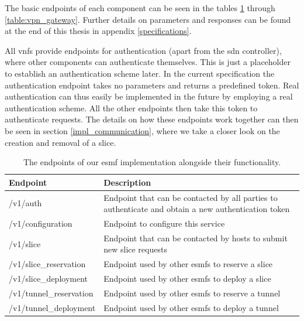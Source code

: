 The basic endpoints of each component can be seen in the tables \ref{table:esmf} through \ref{table:vpn_gateway}. Further details on parameters and responses can be found at the end of this thesis in appendix \ref{specifications}.

All \acrshort{vnf}s provide endpoints for authentication (apart from the \acrshort{sdn} controller), where other components can authenticate themselves. This is just a placeholder to establish an authentication scheme later. In the current specification the authentication endpoint takes no parameters and returns a predefined token. Real authentication can thus easily be implemented in the future by employing a real authentication scheme. All the other endpoints then take this token to authenticate requests. The details on how these endpoints work together can then be seen in section \ref{impl_communication}, where we take a closer look on the creation and removal of a slice.

\begin{table}[htp]
    \begin{tabularx}{\textwidth}{ |l|X| }
        \hline
        \textbf{Endpoint} & \textbf{Description} \\
        \hline
         /v1/auth & Endpoint that can be contacted by all parties to authenticate and obtain a new authentication token \\
         /v1/configuration & Endpoint to configure this service \\
        \hline
         /v1/slice & Endpoint that can be contacted by hosts to submit new slice requests \\
        \hline
         /v1/slice\_reservation & Endpoint used by other \acrshort{esmf}s to reserve a slice \\
         /v1/slice\_deployment & Endpoint used by other \acrshort{esmf}s to deploy a slice \\
         /v1/tunnel\_reservation & Endpoint used by other \acrshort{esmf}s to reserve a tunnel  \\
         /v1/tunnel\_deployment & Endpoint used by other \acrshort{esmf}s to deploy a tunnel \\
        \hline
    \end{tabularx}
    \caption[\acrshort{esmf} endpoints]{The endpoints of our \acrshort{esmf} implementation alongside their functionality.}
    \label{table:esmf}
\end{table}

